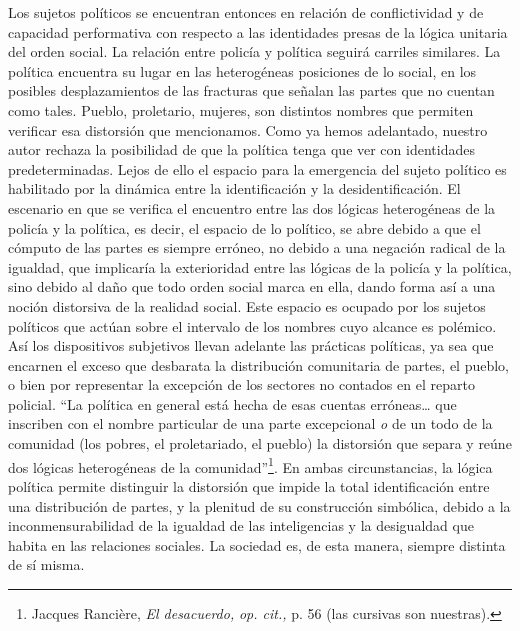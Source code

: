 Los sujetos políticos se encuentran entonces en relación de conflictividad y de capacidad performativa con respecto a las identidades presas de la lógica unitaria del orden social. La relación entre policía y política seguirá carriles similares. La política encuentra su lugar en las heterogéneas posiciones de lo social, en los posibles desplazamientos de las fracturas que señalan las partes que no cuentan como tales. Pueblo, proletario, mujeres, son distintos nombres que permiten verificar esa distorsión que mencionamos. Como ya hemos adelantado, nuestro autor rechaza la posibilidad de que la política tenga que ver con identidades predeterminadas. Lejos de ello el espacio para la emergencia del sujeto político es habilitado por la dinámica entre la identificación y la desidentificación. El escenario en que se verifica el encuentro entre las dos lógicas heterogéneas de la policía y la política, es decir, el espacio de lo político, se abre debido a que el cómputo de las partes es siempre erróneo, no debido a una negación radical de la igualdad, que implicaría la exterioridad entre las lógicas de la policía y la política, sino debido al daño que todo orden social marca en ella, dando forma así a una noción distorsiva de la realidad social. Este espacio es ocupado por los sujetos políticos que actúan sobre el intervalo de los nombres cuyo alcance es polémico. Así los dispositivos subjetivos llevan adelante las prácticas políticas, ya sea que encarnen el exceso que desbarata la distribución comunitaria de partes, el pueblo, o bien por representar la excepción de los sectores no contados en el reparto policial. \enquote{La política en general está hecha de esas cuentas erróneas\ldots{} que inscriben con el nombre particular de una parte excepcional \emph{o} de un todo de la comunidad (los pobres, el proletariado, el pueblo) la distorsión que separa y reúne dos lógicas heterogéneas de la comunidad}\footnote{Jacques Rancière, \emph{El desacuerdo,} \emph{op. cit.,} p. 56 (las cursivas son nuestras).}. En ambas circunstancias, la lógica política permite distinguir la distorsión que impide la total identificación entre una distribución de partes, y la plenitud de su construcción simbólica, debido a la inconmensurabilidad de la igualdad de las inteligencias y la desigualdad que habita en las relaciones sociales. La sociedad es, de esta manera, siempre distinta de sí misma.

